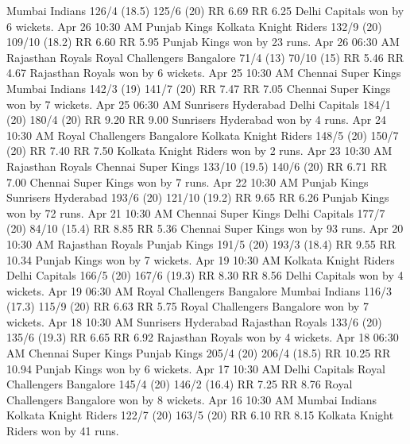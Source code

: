 Mumbai Indians
126/4 (18.5)
125/6 (20)
RR 6.69
RR 6.25
Delhi Capitals won by 6 wickets.
Apr 26
10:30 AM
Punjab Kings
Kolkata Knight Riders
132/9 (20)
109/10 (18.2)
RR 6.60
RR 5.95
Punjab Kings won by 23 runs.
Apr 26
06:30 AM
Rajasthan Royals
Royal Challengers Bangalore
71/4 (13)
70/10 (15)
RR 5.46
RR 4.67
Rajasthan Royals won by 6 wickets.
Apr 25
10:30 AM
Chennai Super Kings
Mumbai Indians
142/3 (19)
141/7 (20)
RR 7.47
RR 7.05
Chennai Super Kings won by 7 wickets.
Apr 25
06:30 AM
Sunrisers Hyderabad
Delhi Capitals
184/1 (20)
180/4 (20)
RR 9.20
RR 9.00
Sunrisers Hyderabad won by 4 runs.
Apr 24
10:30 AM
Royal Challengers Bangalore
Kolkata Knight Riders
148/5 (20)
150/7 (20)
RR 7.40
RR 7.50
Kolkata Knight Riders won by 2 runs.
Apr 23
10:30 AM
Rajasthan Royals
Chennai Super Kings
133/10 (19.5)
140/6 (20)
RR 6.71
RR 7.00
Chennai Super Kings won by 7 runs.
Apr 22
10:30 AM
Punjab Kings
Sunrisers Hyderabad
193/6 (20)
121/10 (19.2)
RR 9.65
RR 6.26
Punjab Kings won by 72 runs.
Apr 21
10:30 AM
Chennai Super Kings
Delhi Capitals
177/7 (20)
84/10 (15.4)
RR 8.85
RR 5.36
Chennai Super Kings won by 93 runs.
Apr 20
10:30 AM
Rajasthan Royals
Punjab Kings
191/5 (20)
193/3 (18.4)
RR 9.55
RR 10.34
Punjab Kings won by 7 wickets.
Apr 19
10:30 AM
Kolkata Knight Riders
Delhi Capitals
166/5 (20)
167/6 (19.3)
RR 8.30
RR 8.56
Delhi Capitals won by 4 wickets.
Apr 19
06:30 AM
Royal Challengers Bangalore
Mumbai Indians
116/3 (17.3)
115/9 (20)
RR 6.63
RR 5.75
Royal Challengers Bangalore won by 7 wickets.
Apr 18
10:30 AM
Sunrisers Hyderabad
Rajasthan Royals
133/6 (20)
135/6 (19.3)
RR 6.65
RR 6.92
Rajasthan Royals won by 4 wickets.
Apr 18
06:30 AM
Chennai Super Kings
Punjab Kings
205/4 (20)
206/4 (18.5)
RR 10.25
RR 10.94
Punjab Kings won by 6 wickets.
Apr 17
10:30 AM
Delhi Capitals
Royal Challengers Bangalore
145/4 (20)
146/2 (16.4)
RR 7.25
RR 8.76
Royal Challengers Bangalore won by 8 wickets.
Apr 16
10:30 AM
Mumbai Indians
Kolkata Knight Riders
122/7 (20)
163/5 (20)
RR 6.10
RR 8.15
Kolkata Knight Riders won by 41 runs.